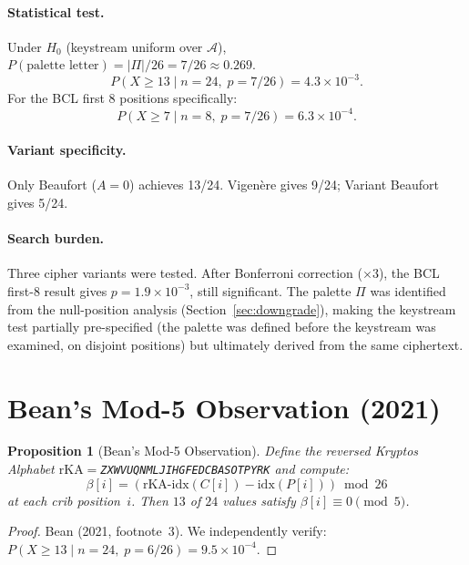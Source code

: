 \documentclass[11pt]{article}
\newtheorem{proposition}{Proposition}
\theoremstyle{remark}
\begin{document}
\paragraph{Statistical test.}
Under $H_0$ (keystream uniform over $\mathcal{A}$),
$P(\text{palette letter}) = |\Pi|/26 = 7/26 \approx 0.269$.
\[
P(X \geq 13 \mid n{=}24,\; p{=}7/26) = 4.3 \times 10^{-3}.
\]
For the BCL first 8 positions specifically:
\[
P(X \geq 7 \mid n{=}8,\; p{=}7/26) = 6.3 \times 10^{-4}.
\]

\paragraph{Variant specificity.}
Only Beaufort ($A{=}0$) achieves 13/24.  Vigen\`ere gives 9/24;
Variant Beaufort gives 5/24.

\paragraph{Search burden.}
Three cipher variants were tested.  After Bonferroni correction
($\times 3$), the BCL first-8 result gives $p = 1.9 \times 10^{-3}$,
still significant.  The palette $\Pi$ was identified from the
null-position analysis (Section~\ref{sec:downgrade}), making the
keystream test partially pre-specified (the palette was defined
before the keystream was examined, on disjoint positions) but
ultimately derived from the same ciphertext.

\section{Bean's Mod-5 Observation (2021)}\label{sec:bean}

\begin{proposition}[Bean's Mod-5 Observation]\label{prop:bean}
Define the reversed Kryptos Alphabet
$\mathrm{rKA} = {}${\small\texttt{ZXWVUQNMLJIHGFEDCBASOTPYRK}} and compute:
\[
\beta[i] = (\mathrm{rKA\text{-}idx}(C[i]) - \mathrm{idx}(P[i])) \bmod 26
\]
at each crib position~$i$.  Then $13$ of $24$ values satisfy
$\beta[i] \equiv 0 \pmod{5}$.
\end{proposition}

\begin{proof}
Bean (2021, footnote~3).  We independently verify:
$P(X \geq 13 \mid n{=}24,\; p{=}6/26) = 9.5 \times 10^{-4}$.
\end{proof}
\end{document}
